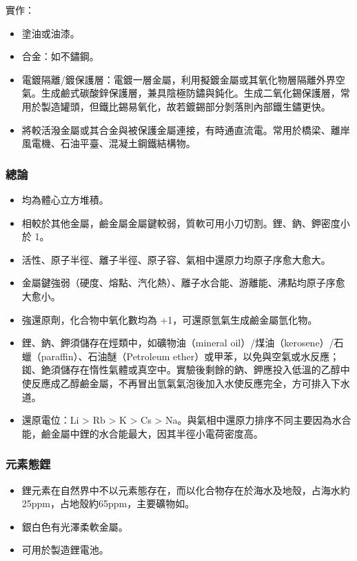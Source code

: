 \documentclass[a4paper,12pt]{report}
\begin{document}
\begin{itemize}
\begin{itemize}
\begin{itemize}
\end{itemize}
實作：
\begin{itemize}
\item 塗油或油漆。
\item 合金：如不鏽鋼。
\item 電鍍隔離/鍍保護層：電鍍一層金屬，利用擬鍍金屬或其氧化物層隔離外界空氣。生成鹼式碳酸鋅保護層，兼具陰極防鏽與鈍化。生成二氧化錫保護層，常用於製造罐頭，但鐵比錫易氧化，故若鍍錫部分剝落則內部鐵生鏽更快。
\item 將較活潑金屬或其合金與被保護金屬連接，有時通直流電。常用於橋梁、離岸風電機、石油平臺、混凝土鋼鐵結構物。
\end{itemize}
\subsubsection{總論}
\begin{itemize}
\item 均為體心立方堆積。
\item 相較於其他金屬，鹼金屬金屬鍵較弱，質軟可用小刀切割。鋰、鈉、鉀密度小於 1。
\item 活性、原子半徑、離子半徑、原子容、氣相中還原力均原子序愈大愈大。
\item 金屬鍵強弱（硬度、熔點、汽化熱）、離子水合能、游離能、沸點均原子序愈大愈小。
\item 強還原劑，化合物中氧化數均為 +1，可還原氫氣生成鹼金屬氫化物。
\item 鋰、鈉、鉀須儲存在烴類中，如礦物油（mineral oil）/煤油（kerosene）/石蠟（paraffin）、石油醚（Petroleum ether）或甲苯，以免與空氣或水反應；銣、銫須儲存在惰性氣體或真空中。實驗後剩餘的鈉、鉀應投入低溫的乙醇中使反應成乙醇鹼金屬，不再冒出氫氣氣泡後加入水使反應完全，方可排入下水道。
\item 還原電位：Li > Rb > K > Cs > Na。與氣相中還原力排序不同主要因為水合能，鹼金屬中鋰的水合能最大，因其半徑小電荷密度高。
\end{itemize}
\subsubsection{元素態鋰}
\begin{itemize}
\item 鋰元素在自然界中不以元素態存在，而以化合物存在於海水及地殼，占海水約25ppm，占地殼約65ppm，主要礦物如。
\item 銀白色有光澤柔軟金屬。
\item 可用於製造鋰電池。
\end{itemize}

\end{itemize}
\end{itemize}
\end{document}

